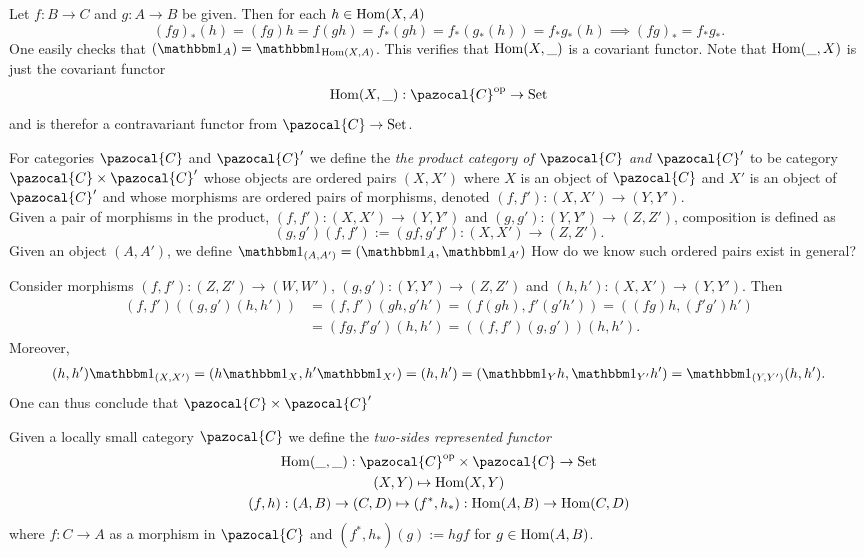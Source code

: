 \begin{remark}
    Let $f: B\rightarrow C$ and $g:A\rightarrow B$ be given. Then for each $h\in \mathrm{Hom}(X,A)$
    $$
        (fg)_\ast(h)= (fg)h= f(gh)= f_\ast(gh)=f_\ast(g_\ast(h))=f_\ast g_\ast(h) \implies (fg)_\ast=f_\ast g_\ast.
    $$ 
    One easily checks that $(\fone_A) = \fone_{\Hom(X,A)}$. This verifies that $\mathrm{Hom}(X,\_)$ is a covariant functor. Note that $\mathrm{Hom}(\_,X)$ is just the covariant functor 
    \begin{gather*}
        \Hom(X,\_) : \pazocal{C}\op \rightarrow \mathrm{Set}
    \end{gather*}
    and is therefor a contravariant functor from $\pazocal{C}\rightarrow \mathrm{Set}$. 
\end{remark}
\begin{definition}
    For categories $\pazocal{C}$ and $\pazocal{C}'$ we define the \emph{the product category of $\pazocal{C}$ and $\pazocal{C}'$} to be category $\pazocal{C}\times \pazocal{C}'$ whose objects are ordered pairs $(X,X')$ where $X$ is an object of $\pazocal{C}$ and $X'$ is an object of $\pazocal{C}'$ and whose morphisms are ordered pairs of morphisms, denoted $(f,f'):(X,X')\rightarrow (Y,Y')$.\\
    Given a pair of morphisms in the product, $(f,f'):(X,X')\rightarrow (Y,Y')$ and $(g,g'): (Y,Y')\rightarrow (Z,Z')$, composition is defined as 
    $$
        (g,g')(f,f') := (gf,g'f') : (X,X')\rightarrow (Z,Z').
    $$
    Given an object $(A,A')$, we define $\fone_{(A,A')} = (\fone_A, \fone_{A'})$    
    {\Large How do we know such ordered pairs exist in general?}
\end{definition}
\begin{remark}
    Consider morphisms $(f,f'):(Z,Z')\rightarrow (W,W')$, $(g,g'): (Y,Y')\rightarrow (Z,Z')$ and $(h,h') : (X,X')\rightarrow (Y,Y')$. Then 
    \begin{align*}
        (f,f')((g,g')(h,h'))&=(f,f')(gh,g'h')=(f(gh),f'(g'h'))= ((fg)h,(f'g')h')\\ &=(fg,f'g')(h,h')
        =((f,f')(g,g'))(h,h').
    \end{align*} 
    Moreover, 
    \begin{align*}
        (h,h')\fone_{(X,X')}= (h\fone_X, h'\fone_{X'}) = (h,h') = (\fone_{Y} h,\fone_{Y'} h')=\fone_{(Y,Y')}(h,h'). 
    \end{align*}
    One can thus conclude that $\pazocal{C}\times \pazocal{C}'$
\end{remark}
\begin{definition}
    Given a locally small category $\pazocal{C}$ we define the \emph{two-sides represented functor}
    \begin{gather*}
        \Hom(\_,\_) : \pazocal{C}\op\times \pazocal{C}\rightarrow \mathrm{Set}\\
        (X,Y) \mapsto \Hom(X,Y)\\
        (f,h) : (A,B)\rightarrow (C,D) \mapsto (f^\ast,h_\ast) : \Hom(A,B)\rightarrow \Hom(C,D)
    \end{gather*}
    where $f: C\rightarrow A$ as a morphism in $\pazocal{C}$ and $(f^\ast,h_\ast)(g) := hgf$ for $g\in \mathrm{Hom}(A,B)$.
\end{definition}
